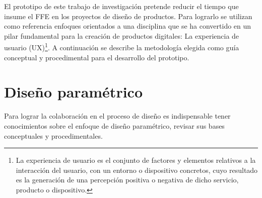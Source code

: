 El prototipo de este trabajo de investigación pretende reducir el tiempo que insume el FFE en los proyectos de diseño de productos. Para lograrlo se utilizan como referencia enfoques orientados a una disciplina que se ha convertido en un pilar fundamental para la creación de productos digitales: La experiencia de usuario (UX)\footnote{La experiencia de usuario es el conjunto de factores y elementos relativos a la interacción del usuario, con un entorno o dispositivo concretos, cuyo resultado es la generación de una percepción positiva o negativa de dicho servicio, producto o dispositivo.}. A continuación se describe la metodología elegida como guía conceptual y procedimental para el desarrollo del prototipo.





\clearpage
\section{Diseño paramétrico} 
\label{disenoparam}
Para lograr la colaboración en el proceso de diseño es indispensable tener conocimientos sobre el enfoque de diseño paramétrico, revisar sus bases conceptuales y procedimentales.

